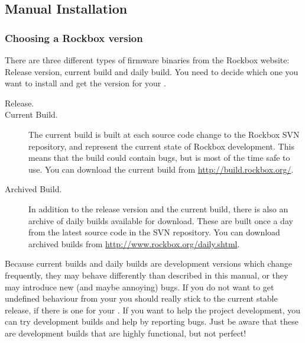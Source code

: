 
\subsection{Manual Installation}

\subsubsection{Choosing a Rockbox version}\label{sec:choosing_version}

There are three different types of firmware binaries from the Rockbox website:
\label{Version}
Release version, current build and daily build. You need to decide which one
you want to install and get the version for your \dap{}.

\begin{description}

\item[Release.]

\item[Current Build.] The current build is built at each source code change to
  the Rockbox SVN repository, and represent the current state of Rockbox
  development. This means that the build could contain bugs, but is most of
  the time safe to use. You can download the current build from  
  \url{http://build.rockbox.org/}.

\item[Archived Build.] In addition to the release version and the current build,
  there is also an archive of daily builds available for download. These are
  built once a day from the latest source code in the SVN repository. You can
  download archived builds from \url{http://www.rockbox.org/daily.shtml}.

\end{description}


Because current builds and daily builds are development versions which change
frequently, they may behave differently than described in this manual, or
they may introduce new (and maybe annoying) bugs. If you do not want to get
undefined behaviour from your \dap{} you should really stick to the current
stable release, if there is one for your \dap{}. If you want to help the
project development, you can try development builds and help by reporting
bugs. Just be aware that these are development builds that are highly
functional, but not perfect!


